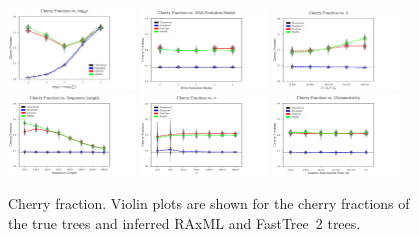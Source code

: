 \begin{figure} %
\centering
\includegraphics[width=0.3\textwidth]{figs/dualbirth-cherry-fraction-supp-a}
\includegraphics[width=0.3\textwidth]{figs/dualbirth-cherry-fraction-supp-b}
\includegraphics[width=0.3\textwidth]{figs/dualbirth-cherry-fraction-supp-c}\\
\includegraphics[width=0.3\textwidth]{figs/dualbirth-cherry-fraction-supp-d}
\includegraphics[width=0.3\textwidth]{figs/dualbirth-cherry-fraction-supp-e}
\includegraphics[width=0.3\textwidth]{figs/dualbirth-cherry-fraction-supp-f}
\caption[Cherry fraction]
{Cherry fraction. Violin plots are shown for the cherry fractions of the true trees and inferred RAxML and FastTree~2 trees.}
\label{fig:dualbirth-cherry-fraction-supp}
\end{figure}

